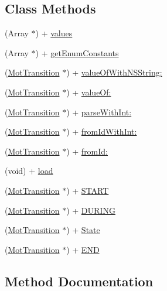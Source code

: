 \subsection*{Class Methods}
\begin{DoxyCompactItemize}
\item 
(Array $\ast$) + \hyperlink{interface_mot_transition_ad44c311ebab50623fc47a5328d5cd009}{values}
\item 
(Array $\ast$) + \hyperlink{interface_mot_transition_ab38c748eda9985d9e9ab0097c71d97ad}{get\+Enum\+Constants}
\item 
(\hyperlink{interface_mot_transition}{Mot\+Transition} $\ast$) + \hyperlink{interface_mot_transition_acdb29d7f9e735ce9c181b004c215b157}{value\+Of\+With\+N\+S\+String\+:}
\item 
(\hyperlink{interface_mot_transition}{Mot\+Transition} $\ast$) + \hyperlink{interface_mot_transition_a016192cfc2f6096f401e3c4cc2edc3cb}{value\+Of\+:}
\item 
(\hyperlink{interface_mot_transition}{Mot\+Transition} $\ast$) + \hyperlink{interface_mot_transition_a06db0ea1f8bea89dbbbfd05ae5c498ca}{parse\+With\+Int\+:}
\item 
(\hyperlink{interface_mot_transition}{Mot\+Transition} $\ast$) + \hyperlink{interface_mot_transition_ac45b8a3b4191e9b27446f0927fc9fc46}{from\+Id\+With\+Int\+:}
\item 
(\hyperlink{interface_mot_transition}{Mot\+Transition} $\ast$) + \hyperlink{interface_mot_transition_a2a572d749db9975afc76c9397291f0c0}{from\+Id\+:}
\item 
(void) + \hyperlink{interface_mot_transition_a29562158abe43ef64618f264380efa1e}{load}
\item 
(\hyperlink{interface_mot_transition}{Mot\+Transition} $\ast$) + \hyperlink{interface_mot_transition_aeb5b28b53b3593273c47a4e1a5c2210b}{S\+T\+A\+R\+T}
\item 
(\hyperlink{interface_mot_transition}{Mot\+Transition} $\ast$) + \hyperlink{interface_mot_transition_a9b41f4c7c9f5c453b568a218d423e10f}{D\+U\+R\+I\+N\+G}
\item 
(\hyperlink{interface_mot_transition}{Mot\+Transition} $\ast$) + \hyperlink{interface_mot_transition_a147c24d1df8bb5384ffd1bb334ff61ec}{State}
\item 
(\hyperlink{interface_mot_transition}{Mot\+Transition} $\ast$) + \hyperlink{interface_mot_transition_ac102db42cb92199b14f853ee6520d245}{E\+N\+D}
\end{DoxyCompactItemize}


\subsection{Method Documentation}
\hypertarget{interface_mot_transition_a9b41f4c7c9f5c453b568a218d423e10f}{}
